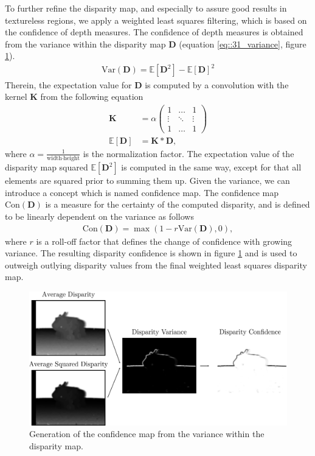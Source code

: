 To further refine the disparity map, and especially to assure good results in textureless  regions, we apply a weighted least squares filtering, which is based on the confidence of depth measures. The confidence of depth measures is obtained from the variance within the disparity map $\bm{D}$ (equation \ref{eq::31_variance}, figure \ref{fig::31_confidence_map}).
\begin{align}
	 \text{Var}(\bm{D}) = \mathbb{E}\left[\bm{D}^2\right] - \mathbb{E}\left[\bm{D}\right]^2
	\label{eq::31_variance}
\end{align} 
Therein, the expectation value for $\bm{D}$ is computed by a convolution with the kernel $\bm{K}$ from the following equation
\begin{align}
	\bm{K} &= \alpha
	\begin{pmatrix}
	1 & \dots & 1 \\
	\vdots & \ddots & \vdots \\
	1 & \dots & 1
	\end{pmatrix} \\
	\mathbb{E}\left[\bm{D}\right] &= \bm{K}*\bm{D},
	\label{eq::31_kernel}
\end{align}
where $\alpha = \frac{1}{\text{width}\cdot\text{height}}$ is the normalization factor. The expectation value of the disparity map squared $\mathbb{E}\left[\bm{D}^2\right]$ is computed in the same way, except for that all elements are squared prior to summing them up. Given the variance, we can introduce a concept which is named confidence map. The confidence map $\text{Con}(\bm{D})$ is a measure for the certainty of the computed disparity, and is defined to be linearly dependent on the variance as follows
\begin{align}
	\text{Con}(\bm{D}) = \max\left(1-r\text{Var}(\bm{D}),0\right),
\end{align}
where $r$ is a roll-off factor that defines the change of confidence with growing variance. The resulting disparity confidence is shown in figure \ref{fig::31_confidence_map} and is used to outweigh outlying disparity values from the final weighted least squares disparity map. 
\begin{figure}[h!]
	\centering
	\includegraphics[scale=.28]{chapters/03_fundamentals_of_image_processing/img/confidence_map.png}
	\caption{Generation of the confidence map from the variance within the disparity map.}
	\label{fig::31_confidence_map}
\end{figure}
